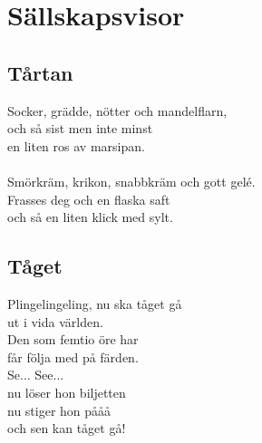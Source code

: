 \chapter{Sällskapsvisor}
\section{Tårtan}
Socker, grädde, nötter och mandelflarn,\\
och så sist men inte minst\\
en liten ros av marsipan.\\
\\
Smörkräm, krikon, snabbkräm och gott gelé.\\
Frasses deg och en flaska saft\\
och så en liten klick med sylt.

\newpage
\section{Tåget}
Plingelingeling, nu ska tåget gå\\
ut i vida världen.\\
Den som femtio öre har\\
får följa med på färden.\\
Se... See...\\
nu löser hon biljetten\\
nu stiger hon pååå\\
och sen kan tåget gå!

